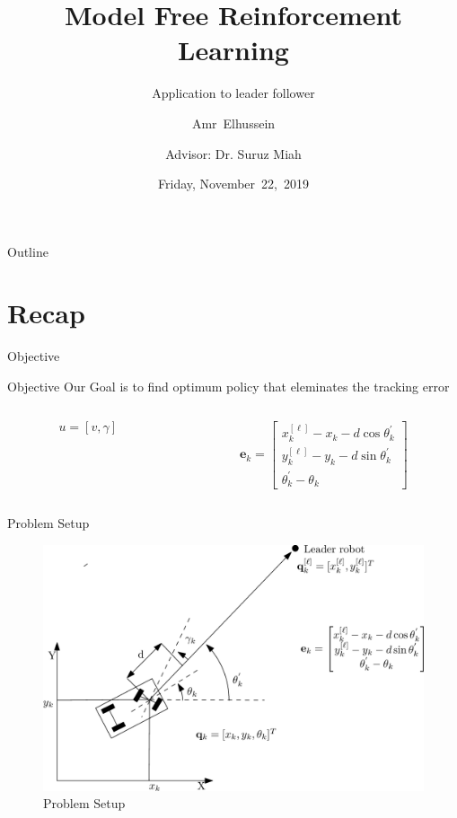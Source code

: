 \documentclass{beamer}
\title{Model Free Reinforcement Learning}
\subtitle{Application to leader follower}
\author[A.Elhussein]{Amr~Elhussein  \\\and
Advisor: Dr. Suruz Miah}
\institute[Bradley University] %
{
  Department of Electrical and Computer Engineering\\
  Bradley University\\
  1501 W. Bradley Avenue\\
  Peoria, IL, 61625, USA
}
\date[November~22,~2019]{Friday, November~22,~2019}
\begin{document}
\begin{frame}
  \titlepage
\end{frame}

\begin{frame}{Outline}
  \tableofcontents
\end{frame}


\section{Recap}
\begin{frame}{Objective}
\begin{block}{Objective}
Our Goal is to find optimum policy that eleminates the tracking error
\end{block}
\begin{columns}
\begin{column}{0.5\textwidth}
\begin{equation}
u = \left[v, \gamma\right]
\end{equation}
\end{column}
\begin{column}{0.5\textwidth}
\begin{equation}
\mathbf{e}_k = \begin{bmatrix}
     x_k^{[\ell]} - x_k - d\cos\theta_k^{'}
    \\ y_k^{[\ell]} - y_k - d\sin\theta_k^{'}
    \\ \theta_k^{'} - \theta_k
  \end{bmatrix}
\end{equation} 
\end{column}
\end{columns}
\end{frame}

\begin{frame}{Problem Setup}

\begin{figure}
\includegraphics[scale=0.23]{figs/ipe/LF-SetupUpdated.eps}
\caption{Problem Setup}
\end{figure}
\end{frame}
\end{document}
